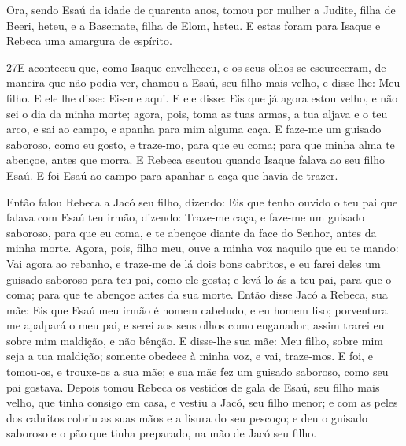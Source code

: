 Ora, sendo Esaú da idade de quarenta anos, tomou por mulher a
Judite, filha de Beeri, heteu, e a Basemate, filha de Elom, heteu.
E estas foram para Isaque e Rebeca uma amargura de espírito.

\smallskip

\lettrine{27} E aconteceu que, como Isaque envelheceu, e os
seus olhos se escureceram, de maneira que não podia ver, chamou a
Esaú, seu filho mais velho, e disse-lhe: Meu filho. E ele lhe disse:
Eis-me aqui. E ele disse: Eis que já agora estou velho, e não
sei o dia da minha morte; agora, pois, toma as tuas armas, a tua
aljava e o teu arco, e sai ao campo, e apanha para mim alguma caça.
E faze-me um guisado saboroso, como eu gosto, e traze-mo, para
que eu coma; para que minha alma te abençoe, antes que morra. E
Rebeca escutou quando Isaque falava ao seu filho Esaú. E foi Esaú ao
campo para apanhar a caça que havia de trazer.

Então falou Rebeca a Jacó seu filho, dizendo: Eis que tenho ouvido
o teu pai que falava com Esaú teu irmão, dizendo: Traze-me caça,
e faze-me um guisado saboroso, para que eu coma, e te abençoe diante
da face do Senhor, antes da minha morte. Agora, pois, filho meu,
ouve a minha voz naquilo que eu te mando: Vai agora ao rebanho,
e traze-me de lá dois bons cabritos, e eu farei deles um guisado
saboroso para teu pai, como ele gosta; e levá-lo-ás a teu
pai, para que o coma; para que te abençoe antes da sua morte.
Então disse Jacó a Rebeca, sua mãe: Eis que Esaú meu irmão é
homem cabeludo, e eu homem liso; porventura me apalpará o meu
pai, e serei aos seus olhos como enganador; assim trarei eu sobre
mim maldição, e não bênção. E disse-lhe sua mãe: Meu filho,
sobre mim seja a tua maldição; somente obedece à minha voz, e vai,
traze-mos. E foi, e tomou-os, e trouxe-os a sua mãe; e sua
mãe fez um guisado saboroso, como seu pai gostava. Depois
tomou Rebeca os vestidos de gala de Esaú, seu filho mais velho, que
tinha consigo em casa, e vestiu a Jacó, seu filho menor; e
com as peles dos cabritos cobriu as suas mãos e a lisura do seu
pescoço; e deu o guisado saboroso e o pão que tinha
preparado, na mão de Jacó seu filho.

